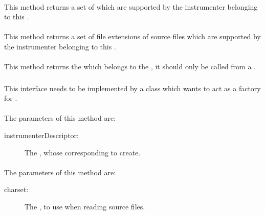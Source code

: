 \paragraph{} \label{Classes:Instrumentation:InstrumenterDescriptor:getSupportedCharsets}
This method returns a set of  which are supported by the instrumenter belonging to this .
\paragraph{} \label{Classes:Instrumentation:InstrumenterDescriptor:getFileExtensions}
This method returns a set of file extensions of source files which are supported by the instrumenter belonging to this .
\paragraph{} \label{Classes:Instrumentation:InstrumenterDescriptor:getInstrumenter}
This method returns the  which belongs to the , it should only be called from a .

\subsubsection{} \label{Classes:Instrumentation:InstrumenterFactory}

This interface needs to be implemented by a class which wants to act as a factory for .

\paragraph{} \label{Classes:Instrumentation:InstrumenterFactory:setInstrumenter}
The parameters of this method are:
\begin{description}
\item[instrumenterDescriptor:] The , whose corresponding  to create.
\end{description}
\paragraph{} \label{Classes:Instrumentation:InstrumenterFactory:setCharset}
The parameters of this method are:
\begin{description}
\item[charset:] The , to use when reading source files.
\end{description}
